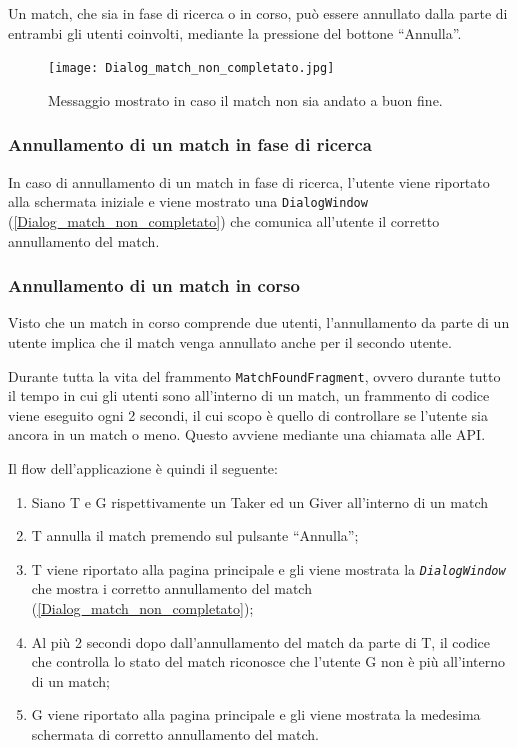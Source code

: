 Un match, che sia in fase di ricerca o in corso, può essere annullato dalla parte di entrambi gli utenti coinvolti, mediante la pressione del bottone ``Annulla''.

\begin{figure}[H]
\centering
\texttt{[image: Dialog\_match\_non\_completato.jpg]}
\caption{Messaggio mostrato in caso il match non sia andato a buon
\label{Dialog_match_non_completato} fine.}
\end{figure}

\hypertarget{annullamento-di-un-match-in-fase-di-ricerca}{%
\subsubsection{Annullamento di un match in fase di ricerca}\label{annullamento-di-un-match-in-fase-di-ricerca}}

In caso di annullamento di un match in fase di ricerca, l'utente viene riportato alla schermata iniziale e viene mostrato una
\texttt{DialogWindow} (\autoref{Dialog_match_non_completato}) che comunica all'utente il corretto annullamento del match.

\hypertarget{annullamento-di-un-match-in-corso}{%
\subsubsection{Annullamento di un match in corso}\label{annullamento-di-un-match-in-corso}}

Visto che un match in corso comprende due utenti, l'annullamento da parte di un utente implica che il match venga annullato anche per il secondo utente.

Durante tutta la vita del frammento \texttt{MatchFoundFragment}, ovvero durante tutto il tempo in cui gli utenti sono all'interno di un match, un frammento di codice viene eseguito ogni 2 secondi, il cui scopo è quello di controllare se l'utente sia ancora in un match o meno. Questo avviene mediante una chiamata alle API.

Il flow dell'applicazione è quindi il seguente:

\begin{enumerate}
    \item Siano T e G rispettivamente un Taker ed un Giver all'interno di un match
    \item T annulla il match premendo sul pulsante ``Annulla'';
    \item T viene riportato alla pagina principale e gli viene mostrata la \emph{\texttt{DialogWindow}} che mostra i corretto annullamento del match (\autoref{Dialog_match_non_completato});
    \item Al più 2 secondi dopo dall'annullamento del match da parte di T, il codice che controlla lo stato del match riconosce che l'utente G non è più all'interno di un match;
    \item G viene riportato alla pagina principale e gli viene mostrata la medesima schermata di corretto annullamento del match.
\end{enumerate}

